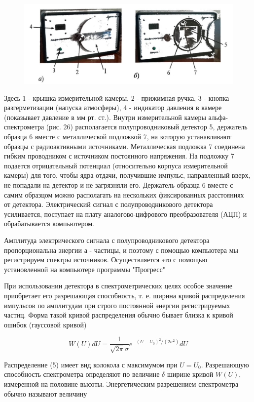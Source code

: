 \documentclass[a4paper, 12pt]{article}
\begin{document}
    \begin{figure}[H]
        \centering
        \includegraphics[width=0.7\linewidth]{res/2.png}
    \end{figure}

    Здесь 1 - крышка измерительной камеры, 2 - прижимная ручка, 3 - кнопка разгерметизации (напуска атмосферы), 4 - индикатор давления в камере (показывает давление в мм рт. ст.). Внутри измерительной камеры альфа-спектрометра (рис. 26) располагается полупроводниковый детектор 5, держатель образца 6 вместе с металлической подложкой 7, на которую устанавливают образцы с радиоактивными источниками. Металлическая подложка 7 соединена гибким проводником с источником постоянного напряжения. На подложку 7 подается отрицательный потенциал (относительно корпуса измерительной камеры) для того, чтобы ядра отдачи, получившие импульс, направленный вверх, не попадали на детектор и не загрязняли его. Держатель образца 6 вместе с самим образцом можно располагать на нескольких фиксированных расстояниях от детектора. Электрический сигнал с полупроводникового детектора усиливается, поступает на плату аналогово-цифрового преобразователя (АЦП) и обрабатывается компьютером.

    Амплитуда электрического сигнала с полупроводникового детектора пропорциональна энергии а - частицы, и поэтому с помощью компьютера мы регистрируем спектры источников. Осуществляется это с помощью установленной на компьютере программы "Прогресс"

    При использовании детектора в спектрометрических целях особое значение приобретает его разрешающая способность, т. е. ширина кривой распределения импульсов по амплитудам при строго постоянной энергии регистрируемых частиц. Форма такой кривой распределения обычно бывает близка к кривой ошибок (гауссовой кривой)

    $$
    W(U) d U=\frac{1}{\sqrt{2 \pi} \sigma} e^{-\left(U-U_0\right)^2 /\left(2 \sigma^2\right)} d U
    $$

    Распределение (5) имеет вид колокола с максимумом при $U=U_0$. Разрешающую способность спектрометра определяют по величине $\delta$ ширине кривой $W(U)$, измеренной на половине высоты. Энергетическим разрешением спектрометра обычно называют величину
\end{document}

